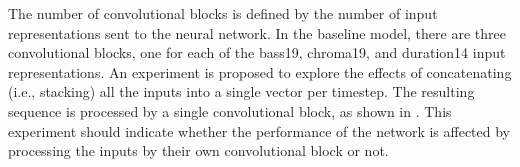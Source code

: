 
The number of convolutional blocks is defined by the number
of input representations sent to the neural network. In the
baseline model, there are three convolutional blocks, one
for each of the \gls{bass19}, \gls{chroma19}, and
\gls{duration14} input representations. An experiment is
proposed to explore the effects of concatenating (i.e.,
stacking) all the inputs into a single vector per timestep.
The resulting sequence is processed by a single
convolutional block, as shown in . This
experiment should indicate whether the performance of the
network is affected by processing the inputs by their own
convolutional block or not.

